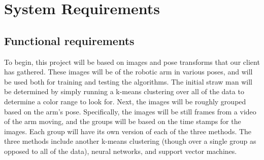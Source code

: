 \documentclass[10pt,journal,compsoc, draftclsnofoot,onecolumn]{IEEEtran}
\begin{document}
\section{System Requirements}

\subsection{Functional requirements}

To begin, this project will be based on images and pose transforms that our client has gathered.
These images will be of the robotic arm in various poses, and will be used both for training and testing the algorithms.
The initial straw man will be determined by simply running a k-means clustering over all of the data to determine a color range to look for.
Next, the images will be roughly grouped based on the arm’s pose.
Specifically, the images will be still frames from a video of the arm moving, and the groups will be based on the time stamps for the images.
Each group will have its own version of each of the three methods.
The three methods include another k-means clustering (though over a single group as opposed to all of the data), neural networks, and support vector machines.
\end{document}
